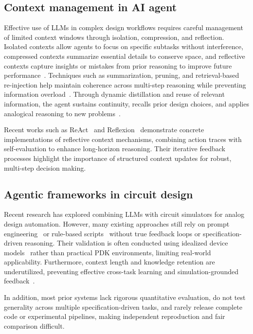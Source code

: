 \documentclass[sigconf,nonacm]{acmart}
\begin{document}
\subsection{Context management in AI agent}

Effective use of LLMs in complex design workflows requires careful management of limited context windows through isolation, compression, and reflection\cite{mei2025survey}. Isolated contexts allow agents to focus on specific subtasks without interference, compressed contexts summarize essential details to conserve space, and reflective contexts capture insights or mistakes from prior reasoning to improve future performance~\cite{chang2025sagallm}. Techniques such as summarization, pruning, and retrieval-based re-injection help maintain coherence across multi-step reasoning while preventing information overload~\cite{packer2023memgpt}. Through dynamic distillation and reuse of relevant information, the agent sustains continuity, recalls prior design choices, and applies analogical reasoning to new problems~\cite{lu2025scaling}.

Recent works such as ReAct~\cite{yao2022react} and Reflexion~\cite{shinn2023reflexion} demonstrate concrete implementations of reflective context mechanisms, combining action traces with self-evaluation to enhance long-horizon reasoning. Their iterative feedback processes highlight the importance of structured context updates for robust, multi-step decision making.



\subsection{Agentic frameworks in circuit design}

Recent research has explored combining LLMs with circuit simulators for analog design automation. However, many existing approaches still rely on prompt engineering~\cite{vungarala2024spicepilot} or rule-based scripts~\cite{zhang2025analogxpert} without true feedback loops or specification-driven reasoning. Their validation is often conducted using idealized device models~\cite{chen2025menter} rather than practical PDK environments, limiting real-world applicability. Furthermore, context length and knowledge retention are underutilized, preventing effective cross-task learning and simulation-grounded feedback~\cite{lai2025analogcoder,chen2024artisan}. 

In addition, most prior systems lack rigorous quantitative evaluation, do not test generality across multiple specification-driven tasks, and rarely release complete code or experimental pipelines, making independent reproduction and fair comparison difficult.
\end{document}
